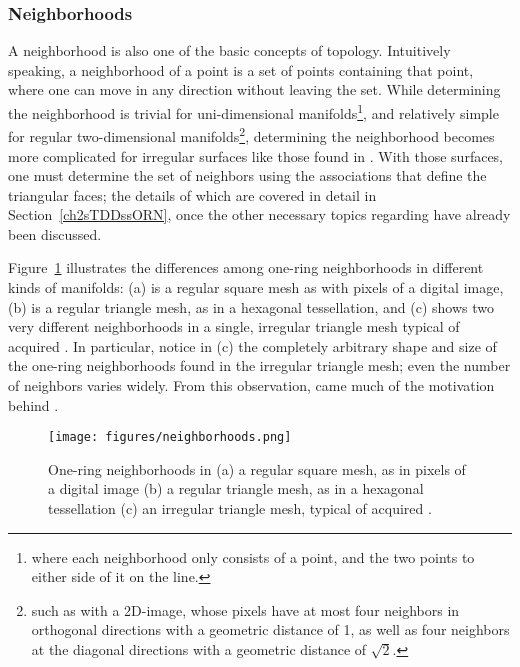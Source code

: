 \subsubsection{Neighborhoods}
\label{ch2sETBssTsssN}
A neighborhood is also one of the basic concepts of topology. Intuitively speaking, a neighborhood of a point is a set of points containing that point, where one can move in any direction without leaving the set. While determining the neighborhood is trivial for uni-dimensional manifolds\footnote{where each neighborhood only consists of a point, and the two points to either side of it on the line.}, and relatively simple for regular two-dimensional manifolds\footnote{such as with a 2D-image, whose pixels have at most four neighbors in orthogonal directions with a geometric distance of 1, as well as four neighbors at the diagonal directions with a geometric distance of $\sqrt{2}$.}, determining the neighborhood becomes more complicated for irregular surfaces like those found in \tdd{}. With those surfaces, one must determine the set of neighbors using the associations that define the triangular faces; the details of which are covered in detail in Section~\ref{ch2sTDDssORN}, once the other necessary topics regarding \tdd{} have already been discussed.

Figure~\ref{fig:neighborhoods} illustrates the differences among one-ring neighborhoods in different kinds of manifolds: (a) is a regular square mesh as with pixels of a digital image, (b) is a regular triangle mesh, as in a hexagonal tessellation, and (c) shows two very different neighborhoods in a single, irregular triangle mesh typical of acquired \tdd{}. In particular, notice in (c) the completely arbitrary shape and size of the one-ring neighborhoods found in the irregular triangle mesh; even the number of neighbors varies widely. From this observation, came much of the motivation behind .

\begin{figure}[ht]
\ffigbox
	{\texttt{[image: figures/neighborhoods.png]}}
	{\caption[One-Ring Neighborhoods in Regular and Irregular Meshes]{One-ring neighborhoods in (a) a regular square mesh, as in pixels of a digital image (b) a regular triangle mesh, as in a hexagonal tessellation (c) an irregular triangle mesh, typical of acquired \tdd{}.}\label{fig:neighborhoods}}
\end{figure}

%
%
%
%
%
%
